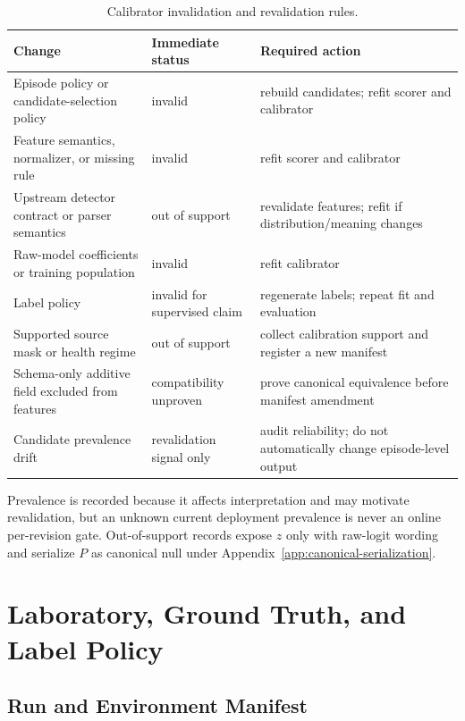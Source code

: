 \begin{table}[t]
\caption{Calibrator invalidation and revalidation rules.}
\label{tab:calibrator-invalidation}
\centering
\small
\begin{tabular}{p{}p{}p{}}
\toprule
\textbf{Change} & \textbf{Immediate status} & \textbf{Required action} \\
\midrule
Episode policy or candidate-selection policy & invalid & rebuild candidates; refit scorer and calibrator \\
Feature semantics, normalizer, or missing rule & invalid & refit scorer and calibrator \\
Upstream detector contract or parser semantics & out of support & revalidate features; refit if distribution/meaning changes \\
Raw-model coefficients or training population & invalid & refit calibrator \\
Label policy & invalid for supervised claim & regenerate labels; repeat fit and evaluation \\
Supported source mask or health regime & out of support & collect calibration support and register a new manifest \\
Schema-only additive field excluded from features & compatibility unproven & prove canonical equivalence before manifest amendment \\
Candidate prevalence drift & revalidation signal only & audit reliability; do not automatically change episode-level output \\
\bottomrule
\end{tabular}
\end{table}

Prevalence is recorded because it affects interpretation and may motivate revalidation, but an
unknown current deployment prevalence is never an online per-revision gate. Out-of-support
records expose $z$ only with raw-logit wording and serialize $P$ as canonical null under
Appendix~\ref{app:canonical-serialization}.

\section{Laboratory, Ground Truth, and Label Policy}
\label{app:lab-label-policy}

\subsection{Run and Environment Manifest}


